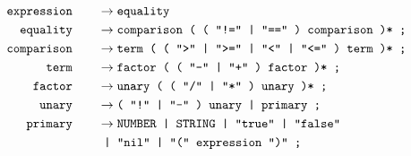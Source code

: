 \documentclass[12pt, a4paper]{article}
\newcommand{\ttt}[1]{
    \text{\texttt{#1}}
}
\newcommand{\ebnfnode}[2]{%
    #1\hspace{20px} &\to #2\\
}
\newcommand{\ebnfnodett}[2]{%
    \ebnfnode{\ttt{#1}}{\ttt{#2}}
}
\begin{document}
    \begin{align*}
        \ebnfnodett{expression}{equality}
        \ebnfnodett{equality}{comparison ( ( "!=" | "==" ) comparison )* ;}
        \ebnfnodett{comparison}{term ( ( ">" | ">=" | "<" | "<=" ) term )* ;}
        \ebnfnodett{term}{factor ( ( "-" | "+" ) factor )* ;}
        \ebnfnodett{factor}{unary ( ( "/" | "*" ) unary )* ;}
        \ebnfnodett{unary}{( "!" | "-" ) unary | primary ;}
        \ebnfnode{\ttt{primary}}{\ttt{NUMBER | STRING | "true" | "false"}\\&\ttt{ | "nil" | "(" expression ")" ;}}
    \end{align*}
\end{document}
